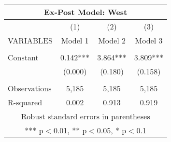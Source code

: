 \begin{tabular}{lccc}
\multicolumn{4}{c}{Ex-Post Model: West} \\ \hline
 & (1) & (2) & (3) \\
VARIABLES & Model 1 & Model 2 & Model 3 \\ \hline
 &  &  &  \\
Constant & 0.142*** & 3.864*** & 3.809*** \\
 & (0.000) & (0.180) & (0.158) \\
 &  &  &  \\
Observations & 5,185 & 5,185 & 5,185 \\
 R-squared & 0.002 & 0.913 & 0.919 \\ \hline
\multicolumn{4}{c}{ Robust standard errors in parentheses} \\
\multicolumn{4}{c}{ *** p$<$0.01, ** p$<$0.05, * p$<$0.1} \\
\end{tabular}
